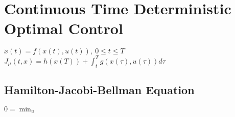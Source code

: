 \section*{Continuous Time Deterministic Optimal Control}
$\dot{x}(t) = f(x(t), u(t)), \ 0 \leq t \leq T$\\
$J_{\mu}(t,x) = h(x(T)) + \int_t^T g(x(\tau), u(\tau))d\tau$
\subsection*{Hamilton-Jacobi-Bellman Equation}
$0 = \min_u$